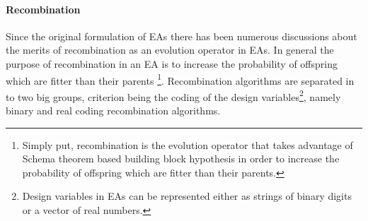\paragraph{Recombination}
Since the original formulation of EAs there has been numerous discussions about the merits of recombination as an evolution operator in EAs. In general the purpose of recombination in an EA is to increase the probability of offspring which are fitter than their parents \footnote{Simply put, recombination is the evolution operator that takes advantage of Schema theorem based building block hypothesis in order to increase the probability of offspring which are fitter than their parents.}. Recombination algorithms are separated in to two big groups, criterion being the coding of the design variables\footnote{Design variables in EAs can be represented either as strings of binary digits or a vector of real numbers.}, namely binary and real coding recombination algorithms.  

